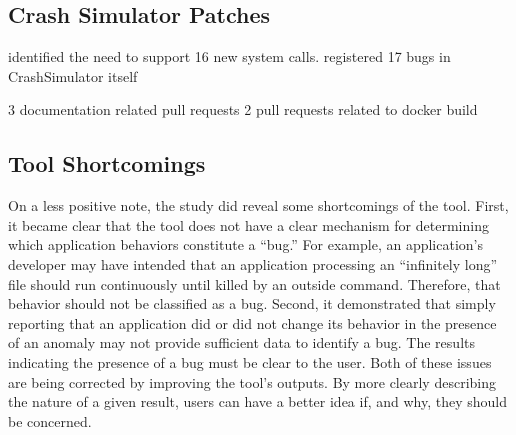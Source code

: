 \subsection{Crash Simulator Patches}
\label{subsec:crashsim-patches}


identified the need to support 16 new system calls.
registered 17 bugs in CrashSimulator itself

3 documentation related pull requests
2 pull requests related to docker build

\subsection{Tool Shortcomings}
\label{subsec:tool-shortcomings}
On a less positive note,
the study did reveal
some shortcomings
of the tool.
First,
it became clear that the tool
does not have a clear mechanism
for determining
which application behaviors constitute a ``bug.''
For example, an application's developer
may have intended that an application processing an ``infinitely long'' file should run continuously
until killed by an outside command.
Therefore, that behavior should not be classified as a bug.
Second,
it demonstrated that
simply reporting that an application did or did not change its behavior
in the presence of an anomaly may not provide sufficient data to identify a bug. The results indicating the presence of a bug must be clear to the user.
Both of these issues are being corrected
by improving the tool's outputs.
By more clearly describing
the nature of a given result,
users can have a better idea
if,
and why,
they should be concerned.

